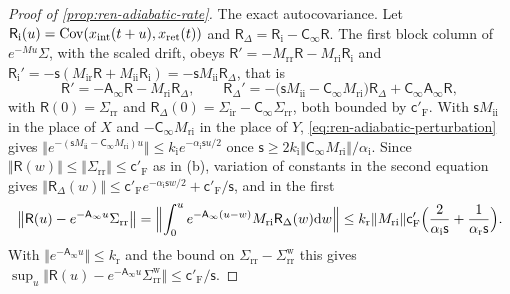 \begin{proof}[Proof of \cref{prop:ren-adiabatic-rate}]
The exact autocovariance. Let $\mathsf R_{\mathrm i}(u)=\operatorname{Cov}(x_{\mathrm{int}}(t+u),x_{\mathrm{ret}}(t))$ and $\mathsf R_\Delta=\mathsf R_{\mathrm i}-\mathsf C_\infty\mathsf R$. The first block column of $e^{-Mu}\Sigma$, with the scaled drift, obeys $\mathsf R'=-M_{\mathrm{rr}}\mathsf R-M_{\mathrm{ri}}\mathsf R_{\mathrm i}$ and $\mathsf R_{\mathrm i}'=-\mathsf s(M_{\mathrm{ir}}\mathsf R+M_{\mathrm{ii}}\mathsf R_{\mathrm i})=-\mathsf sM_{\mathrm{ii}}\mathsf R_\Delta$, that is
\[
\mathsf R'=-\mathsf A_\infty\mathsf R-M_{\mathrm{ri}}\mathsf R_\Delta,\qquad\mathsf R_\Delta'=-\bigl(\mathsf sM_{\mathrm{ii}}-\mathsf C_\infty M_{\mathrm{ri}}\bigr)\mathsf R_\Delta+\mathsf C_\infty\mathsf A_\infty\mathsf R,
\]
with $\mathsf R(0)=\Sigma_{\mathrm{rr}}$ and $\mathsf R_\Delta(0)=\Sigma_{\mathrm{ir}}-\mathsf C_\infty\Sigma_{\mathrm{rr}}$, both bounded by $\mathsf c'_{\mathrm F}$. With $\mathsf sM_{\mathrm{ii}}$ in the place of $X$ and $-\mathsf C_\infty M_{\mathrm{ri}}$ in the place of $Y$, \eqref{eq:ren-adiabatic-perturbation} gives $\Vert e^{-(\mathsf sM_{\mathrm{ii}}-\mathsf C_\infty M_{\mathrm{ri}})u}\Vert\le k_{\mathrm i}e^{-\alpha_{\mathrm i}\mathsf su/2}$ once $\mathsf s\ge2k_{\mathrm i}\Vert\mathsf C_\infty M_{\mathrm{ri}}\Vert/\alpha_{\mathrm i}$. Since $\Vert\mathsf R(w)\Vert\le\Vert\Sigma_{\mathrm{rr}}\Vert\le\mathsf c'_{\mathrm F}$ as in (b), variation of constants in the second equation gives $\Vert\mathsf R_\Delta(w)\Vert\le\mathsf c'_{\mathrm F}e^{-\alpha_{\mathrm i}\mathsf sw/2}+\mathsf c'_{\mathrm F}/\mathsf s$, and in the first
\[
\bigl\Vert\mathsf R(u)-e^{-\mathsf A_\infty u}\Sigma_{\mathrm{rr}}\bigr\Vert=\Bigl\Vert\int_0^ue^{-\mathsf A_\infty(u-w)}M_{\mathrm{ri}}\mathsf R_\Delta(w)\mathrm dw\Bigr\Vert\le k_{\mathrm r}\Vert M_{\mathrm{ri}}\Vert\mathsf c'_{\mathrm F}\Bigl(\frac2{\alpha_{\mathrm i}\mathsf s}+\frac1{\alpha_{\mathrm r}\mathsf s}\Bigr).
\]
With $\Vert e^{-\mathsf A_\infty u}\Vert\le k_{\mathrm r}$ and the bound on $\Sigma_{\mathrm{rr}}-\Sigma^{\mathrm w}_{\mathrm{rr}}$ this gives $\sup_u\Vert\mathsf R(u)-e^{-\mathsf A_\infty u}\Sigma^{\mathrm w}_{\mathrm{rr}}\Vert\le\mathsf c'_{\mathrm F}/\mathsf s$.


\end{proof}
